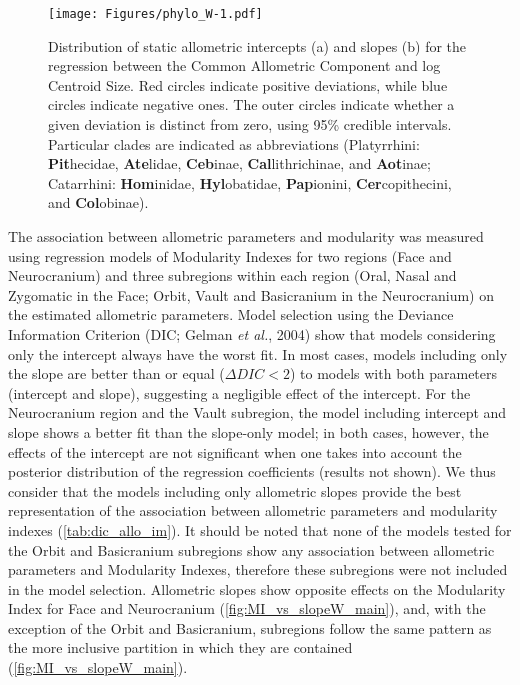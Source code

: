 \documentclass[12pt,]{article}
\begin{document}
\begin{figure}[htbp]
\centering
\texttt{[image: Figures/phylo\_W-1.pdf]}
\caption{Distribution of static allometric intercepts (a) and slopes (b)
for the regression between the Common Allometric Component and log
Centroid Size. Red circles indicate positive deviations, while blue
circles indicate negative ones. The outer circles indicate whether a
given deviation is distinct from zero, using 95\% credible intervals.
Particular clades are indicated as abbreviations (Platyrrhini:
\textbf{Pit}hecidae, \textbf{Ate}lidae, \textbf{Ceb}inae,
\textbf{Cal}lithrichinae, and \textbf{Aot}inae; Catarrhini:
\textbf{Hom}inidae, \textbf{Hyl}obatidae, \textbf{Pap}ionini,
\textbf{Cer}copithecini, and \textbf{Col}obinae). \label{fig:phylo_W}}
\end{figure}

The association between allometric parameters and modularity was
measured using regression models of Modularity Indexes for two regions
(Face and Neurocranium) and three subregions within each region (Oral,
Nasal and Zygomatic in the Face; Orbit, Vault and Basicranium in the
Neurocranium) on the estimated allometric parameters. Model selection
using the Deviance Information Criterion (DIC; Gelman \emph{et al.},
2004) show that models considering only the intercept always have the
worst fit. In most cases, models including only the slope are better
than or equal ($\Delta DIC < 2$) to models with both parameters
(intercept and slope), suggesting a negligible effect of the intercept.
For the Neurocranium region and the Vault subregion, the model including
intercept and slope shows a better fit than the slope-only model; in
both cases, however, the effects of the intercept are not significant
when one takes into account the posterior distribution of the regression
coefficients (results not shown). We thus consider that the models
including only allometric slopes provide the best representation of the
association between allometric parameters and modularity indexes
(\autoref{tab:dic_allo_im}). It should be noted that none of the models
tested for the Orbit and Basicranium subregions show any association
between allometric parameters and Modularity Indexes, therefore these
subregions were not included in the model selection. Allometric slopes
show opposite effects on the Modularity Index for Face and Neurocranium
(\autoref{fig:MI_vs_slopeW_main}), and, with the exception of the Orbit
and Basicranium, subregions follow the same pattern as the more
inclusive partition in which they are contained
(\autoref{fig:MI_vs_slopeW_main}).
\end{document}

